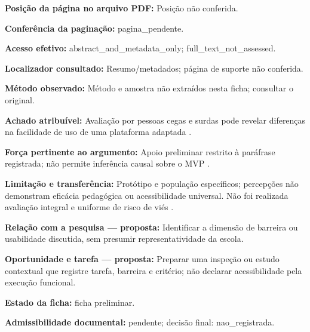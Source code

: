 \noindent\textbf{Posição da página no arquivo PDF:} Posição não conferida.\par\medskip

\noindent\textbf{Conferência da paginação:} pagina\_pendente.\par\medskip

\noindent\textbf{Acesso efetivo:} abstract\_and\_metadata\_only; full\_text\_not\_assessed.\par\medskip

\noindent\textbf{Localizador consultado:} Resumo/metadados; página de suporte não conferida.\par\medskip

\noindent\textbf{Método observado:} Método e amostra não extraídos nesta ficha; consultar o original.\par\medskip

\noindent\textbf{Achado atribuível:} Avaliação por pessoas cegas e surdas pode revelar diferenças na facilidade de uso de uma plataforma adaptada \citep{batanero2021}.\par\medskip

\noindent\textbf{Força pertinente ao argumento:} Apoio preliminar restrito à paráfrase registrada; não permite inferência causal sobre o MVP \citep{batanero2021}.\par\medskip

\noindent\textbf{Limitação e transferência:} Protótipo e população específicos; percepções não demonstram eficácia pedagógica ou acessibilidade universal. Não foi realizada avaliação integral e uniforme de risco de viés \citep{batanero2021}.\par\medskip

\noindent\textbf{Relação com a pesquisa — proposta:} Identificar a dimensão de barreira ou usabilidade discutida, sem presumir representatividade da escola.\par\medskip

\noindent\textbf{Oportunidade e tarefa — proposta:} Preparar uma inspeção ou estudo contextual que registre tarefa, barreira e critério; não declarar acessibilidade pela execução funcional.\par\medskip

\noindent\textbf{Estado da ficha:} ficha preliminar.\par\medskip

\noindent\textbf{Admissibilidade documental:} pendente; decisão final: nao\_registrada.\par\medskip


